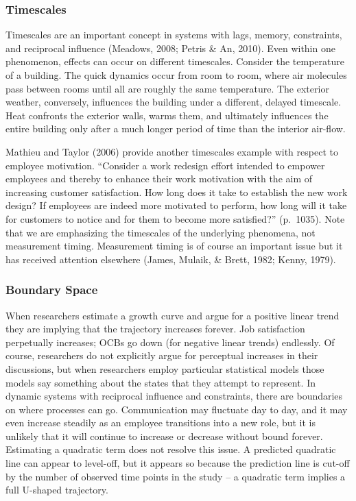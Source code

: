 \documentclass[english,,man]{apa6}
\theoremstyle{definition}
\theoremstyle{definition}
\theoremstyle{definition}
\theoremstyle{remark}
\begin{document}
\hypertarget{timescales}{%
\subsubsection{Timescales}\label{timescales}}

Timescales are an important concept in systems with lags, memory,
constraints, and reciprocal influence (Meadows, 2008; Petris \& An,
2010). Even within one phenomenon, effects can occur on different
timescales. Consider the temperature of a building. The quick dynamics
occur from room to room, where air molecules pass between rooms until
all are roughly the same temperature. The exterior weather, conversely,
influences the building under a different, delayed timescale. Heat
confronts the exterior walls, warms them, and ultimately influences the
entire building only after a much longer period of time than the
interior air-flow.

Mathieu and Taylor (2006) provide another timescales example with
respect to employee motivation. \enquote{Consider a work redesign effort
intended to empower employees and thereby to enhance their work
motivation with the aim of increasing customer satisfaction. How long
does it take to establish the new work design? If employees are indeed
more motivated to perform, how long will it take for customers to notice
and for them to become more satisfied?} (p.~1035). Note that we are
emphasizing the timescales of the underlying phenomena, not measurement
timing. Measurement timing is of course an important issue but it has
received attention elsewhere (James, Mulaik, \& Brett, 1982; Kenny,
1979).

\hypertarget{boundary-space}{%
\subsubsection{Boundary Space}\label{boundary-space}}

When researchers estimate a growth curve and argue for a positive linear
trend they are implying that the trajectory increases forever. Job
satisfaction perpetually increases; OCBs go down (for negative linear
trends) endlessly. Of course, researchers do not explicitly argue for
perceptual increases in their discussions, but when researchers employ
particular statistical models those models say something about the
states that they attempt to represent. In dynamic systems with
reciprocal influence and constraints, there are boundaries on where
processes can go. Communication may fluctuate day to day, and it may
even increase steadily as an employee transitions into a new role, but
it is unlikely that it will continue to increase or decrease without
bound forever. Estimating a quadratic term does not resolve this issue.
A predicted quadratic line can appear to level-off, but it appears so
because the prediction line is cut-off by the number of observed time
points in the study -- a quadratic term implies a full U-shaped
trajectory.
\end{document}
